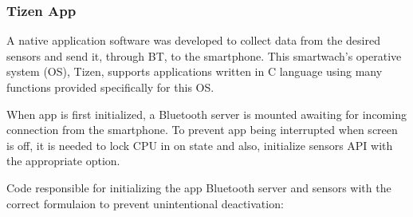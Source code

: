 \subsubsection{Tizen App}

A native application software was developed to collect data from the desired sensors and send it, through BT, to the smartphone.
This smartwach's operative system (OS), Tizen, supports applications written in C language using many functions provided specifically for this OS.

When app is first initialized, a Bluetooth server is mounted awaiting for incoming connection from the smartphone. To prevent app being interrupted when screen is off, it is needed to lock CPU in on state and also, initialize sensors API with the appropriate option.

Code responsible for initializing the app Bluetooth server and sensors with the correct formulaion to prevent unintentional deactivation:

